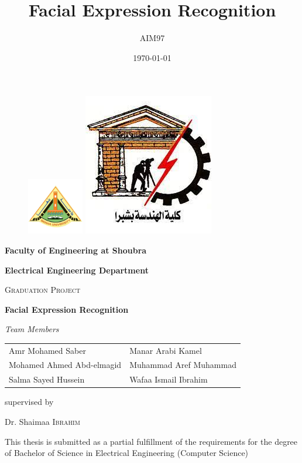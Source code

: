 \documentclass[a4paper]{book}
\title{Facial Expression Recognition}
\author{AIM97}
\date{\today}
\begin{document}
\begin{titlepage}
	\begin{figure}[hp]
		\includegraphics[width=0.22\textwidth]{images/benha1.png}
		\hspace{0.37\textheight}
		\includegraphics[scale=0.39]{images/feng.jpeg}
	\end{figure}
		
	\centering
	\par
	\vspace{1.5cm}
	\textbf{Faculty of Engineering at Shoubra}\par 
	\vspace{0.5cm}
	\textbf{Electrical Engineering Department} \par
	\vspace{1cm}
	{\scshape\Large Graduation Project\par}
	\vspace{1.5cm}
	{\huge\bfseries Facial Expression Recognition\par}
	\vspace{2cm}
	{\Large\itshape Team Members\par}
	{\renewcommand{\arraystretch}{2}
	\begin{center}
	\begin{tabular}[width=0.9\textwidth]{m{11cm} m{6cm}}
		Amr Mohamed Saber & Manar Arabi Kamel \\
		Mohamed Ahmed Abd-elmagid  & Muhammad Aref Muhammad\\
		Salma Sayed Hussein  & Wafaa Ismail Ibrahim
	\end{tabular}
	\end{center}
	}
	
	\vfill
	supervised by\par
	Dr. Shaimaa \textsc{Ibrahim}
	\par
	\vfill
	
	{\large This thesis is submitted as a partial fulfillment of the requirements for the degree of Bachelor of Science in Electrical Engineering (Computer Science) \par}
\end{titlepage}
\restoregeometry
\end{document}
